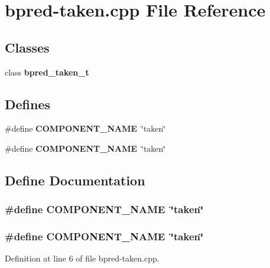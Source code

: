 \section{bpred-taken.cpp File Reference}
\label{bpred-taken_8cpp}
\subsection*{Classes}
\begin{CompactItemize}
\item 
class {\bf bpred\_\-taken\_\-t}
\end{CompactItemize}
\subsection*{Defines}
\begin{CompactItemize}
\item 
\#define {\bf COMPONENT\_\-NAME}~\char`\"{}taken\char`\"{}
\item 
\#define {\bf COMPONENT\_\-NAME}~\char`\"{}taken\char`\"{}
\end{CompactItemize}


\subsection{Define Documentation}
\subsubsection[{COMPONENT\_\-NAME}]{\setlength{\rightskip}{0pt plus 5cm}\#define COMPONENT\_\-NAME~\char`\"{}taken\char`\"{}}\label{zesto-bpred_8cpp_9146ade7ce24e3db226a973a59063892}


\subsubsection[{COMPONENT\_\-NAME}]{\setlength{\rightskip}{0pt plus 5cm}\#define COMPONENT\_\-NAME~\char`\"{}taken\char`\"{}}\label{bpred-taken_8cpp_9146ade7ce24e3db226a973a59063892}




Definition at line 6 of file bpred-taken.cpp.